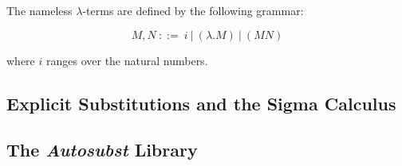 \begin{definition}
  The nameless $\lambda$-terms are defined by the following grammar:

  \[ M, N \ ::= \ i \ | \ (\lambda . M) \ | \ (M N) \]

  where $i$ ranges over the natural numbers.
\end{definition}

\subsection{Explicit Substitutions and the Sigma Calculus}



\subsection{The \textit{Autosubst} Library}

